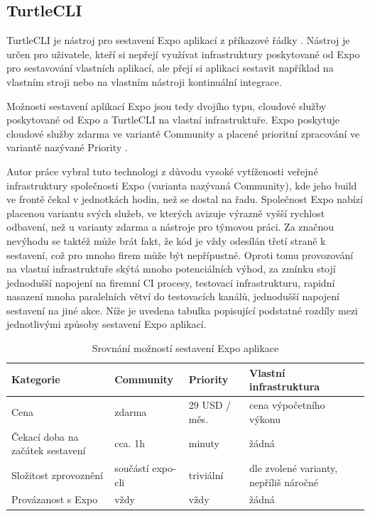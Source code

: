 \subsection{TurtleCLI}

TurtleCLI je nástroj pro sestavení Expo aplikací z příkazové řádky \cite{Sokal2019}. Nástroj je určen pro uživatele, kteří si nepřejí využívat infrastruktury poskytované od Expo pro sestavování vlastních aplikací, ale přejí si aplikaci sestavit například na vlastním stroji nebo na vlastním nástroji kontinuální integrace.

Možnosti sestavení aplikací Expo jsou tedy dvojího typu, cloudové služby poskytované od Expo a TurtleCLI na vlastní infrastruktuře. Expo poskytuje cloudové služby zdarma ve variantě Community a placené prioritní zpracování ve variantě nazývané Priority \cite{expoDevServices}.

Autor práce vybral tuto technologi z důvodu vysoké vytíženosti veřejné infrastruktury společnosti Expo (varianta nazývaná Community), kde jeho build ve frontě čekal v jednotkách hodin, než se dostal na řadu. Společnost Expo nabízí placenou variantu svých služeb, ve kterých avizuje výrazně vyšší rychlost odbavení, než u varianty zdarma a nástroje pro týmovou práci. Za značnou nevýhodu se taktéž může brát fakt, že kód je vždy odesílán třetí straně k sestavení, což pro mnoho firem může být nepřípustné. Oproti tomu provozování na vlastní infrastruktuře skýtá mnoho potenciálních výhod, za zmínku stojí jednodušší napojení na firemní CI procesy, testovací infrastrukturu, rapidní nasazení mnoha paralelních větví do testovacích kanálů, jednodušší napojení sestavení na jiné akce. Níže je uvedena tabulka popisující podstatné rozdíly mezi jednotlivými způsoby sestavení Expo aplikací. 

\begin{table}[H]
	\begin{tabularx}{\textwidth}{|X|X|X|X|}
		\hline
		Kategorie                        & Community         & Priority      & Vlastní infrastruktura                 \\
		\hline
		Cena                             & zdarma            & 29 USD / měs. & cena výpočetního výkonu                \\
		\hline
		Čekací doba na začátek sestavení & cca. 1h           & minuty        & žádná                                  \\
		\hline
		Složitost zprovoznění            & součástí expo-cli & triviální     & dle zvolené varianty, nepříliš náročné \\
		\hline
		Provázanost s Expo               & vždy              & vždy          & žádná \\     
		\hline             
	\end{tabularx}
	\caption{Srovnání možností sestavení Expo aplikace}
\end{table}